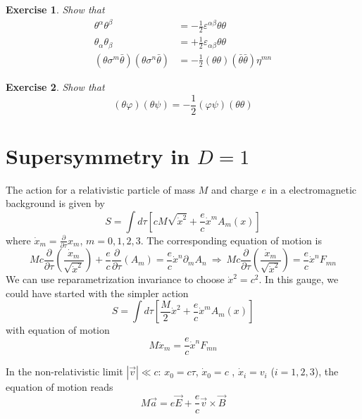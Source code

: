 \documentclass[a4paper,12pt]{article}
\newtheorem{exe}{Exercise}
\numberwithin{equation}{section}
\numberwithin{exe}{section}
\newcommand{\p}{{\partial}}
\newcommand{\xd}{{\dot x}}
\renewcommand{\a}{{\alpha}}
\renewcommand{\b}{{\beta}}
\newcommand{\ve}{{\varepsilon}}
\newcommand{\s}{{\sigma}}
\renewcommand{\t}{{\theta}}
\newcommand{\tb}{{\bar\theta}}
\newcommand{\vphi}{{\varphi}}
\begin{document}
	\begin{exe}
	Show that
		\begin{align}
		\t^\a \t^\b & = -\frac12 \ve^{\a\b} \t\t \\
		\t_\a \t_\b & = +\frac12 \ve_{\a\b} \t\t \\
		(\t\s^m\tb)(\t\s^n\tb) & = -\frac12 (\t\t) (\tb\tb) \eta^{mn}
		\end{align}
	\end{exe}

	\begin{exe}
	Show that
		\begin{equation}
		(\t\vphi) (\t\psi) = -\frac12 (\vphi\psi) (\t\t)
		\end{equation}
	\end{exe}

\newpage



\section{Supersymmetry in $D=1$}

The action for a relativistic particle of mass $M$ and charge $e$ in a electromagnetic background is given by
	\begin{equation}
	S = \int d\tau \left[ cM\sqrt{\xd^2} + \frac{e}{c} \xd^m A_m(x) \right]
	\end{equation}
where $\xd_m = \frac{\p}{\p\tau} x_m$, $m=0,1,2,3$. The corresponding equation of motion is
	\begin{equation}
	Mc\frac{\p}{\p\tau}\left(\frac{\xd_m}{\sqrt{\xd^2}}\right) + \frac{e}{c}\frac{\p}{\p\tau}(A_m) = \frac{e}{c} \xd^n\p_m A_n\ \Rightarrow\ Mc\frac{\p}{\p\tau}\left(\frac{\xd_m}{\sqrt{\xd^2}}\right) = \frac{e}{c} \xd^n F_{mn}
	\end{equation}
We can use reparametrization invariance to choose $\xd^2 = c^2$. In this gauge, we could have started with the simpler action
	\begin{equation}
	S = \int d\tau \left[ \frac{M}{2} \xd^2 + \frac{e}{c}\xd^m A_m(x) \right]
	\end{equation}
with equation of motion
	\begin{equation}
	M \ddot{x}_m = \frac{e}{c}\xd^n F_{mn}
	\end{equation}

In the non-relativistic limit $|\vec v|\ll c$: $x_0 = c\tau$, $\xd_0 = c$ , $ \xd_i = v_i$ ($i=1,2,3$), the equation of motion reads
	\begin{equation}
	M \vec a = e \vec E + \frac{e}{c}\vec v \times \vec B
	\end{equation}
\end{document}
